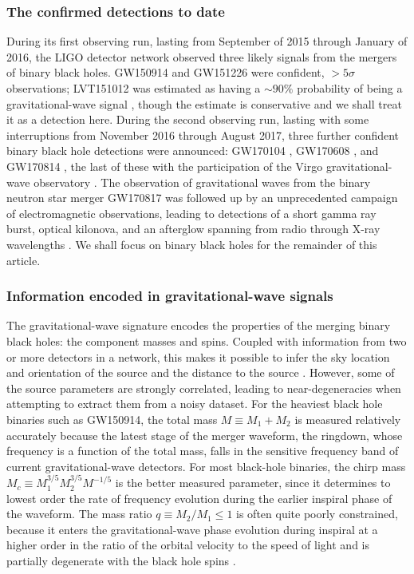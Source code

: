 \documentclass[iop,onecolumn]{revtex4}
\begin{document}
\subsubsection{The confirmed detections to date}
During its first observing run, lasting from September of 2015 through January of 2016, the LIGO detector network observed three likely signals from the mergers of binary black holes.  GW150914 \citep{GW150914} and GW151226 \citep{GW151226} were confident, $> 5\sigma$ observations; LVT151012 was estimated as having a $\sim 90\%$ probability of being a gravitational-wave signal \citep{GW150914:rates,BBH:O1}, though the estimate is conservative and we shall treat it as a detection here.  During the second observing run, lasting with some interruptions from November 2016 through August 2017, three further confident binary black hole detections were announced: GW170104 \citep{GW170104},  GW170608 \citep{GW170608}, and GW170814 \citep{GW170814}, the last of these with the participation of the Virgo gravitational-wave observatory \citep{AdvVirgo}.   The observation of gravitational waves from the binary neutron star merger GW170817 \citep{GW170817} was followed up by an unprecedented campaign of electromagnetic observations, leading to detections of a short gamma ray burst, optical kilonova, and an afterglow spanning from radio through X-ray wavelengths \citep{GW170817:GRB,GW170817:MMA}.  We shall focus on binary black holes for the remainder of this article.

\subsubsection{Information encoded in gravitational-wave signals}
The gravitational-wave signature encodes the properties of the merging binary black holes: the component masses and spins. Coupled with information from two or more detectors in a network, this makes it possible to infer the sky location and orientation of the source and the distance to the source \citep{Veitch:2014,GW150914:PE}.  However, some of the source parameters are strongly correlated, leading to near-degeneracies when attempting to extract them from a noisy dataset.   For the heaviest black hole binaries such as GW150914, the total mass $M \equiv M_1 + M_2$ is measured relatively accurately because the latest stage of the merger waveform, the ringdown, whose frequency is a function of the total mass, falls in the sensitive frequency band of current gravitational-wave detectors.  For most black-hole binaries, the chirp mass $M_c \equiv M_1^{3/5} M_2^{3/5} M^{-1/5}$ is the better measured parameter, since it determines to lowest order the rate of frequency evolution during the earlier inspiral phase of the waveform.  The mass ratio $q\equiv M_2/M_1 \leq 1$ is often quite poorly constrained, because it enters the gravitational-wave phase evolution during inspiral at a higher order in the ratio of the orbital velocity to the speed of light and is partially degenerate with the black hole spins \citep[e.g.,][]{PoissonWill:1995}.  
\end{document}
